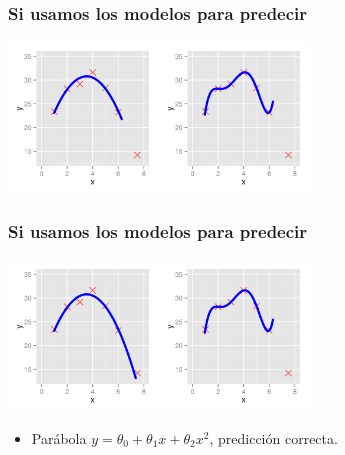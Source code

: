 \documentclass{beamer}
\begin{document}
 \begin{frame}\frametitle{Si usamos los modelos para predecir}
      \begin{overlayarea}{\textwidth}{8cm} 
 \begin{center}
   \includegraphics[height=4cm]{xyregularization-prediccion2050.png}
 \end{center}

   \end{overlayarea}

 \end{frame}
  \begin{frame}\frametitle{Si usamos los modelos para predecir}
      \begin{overlayarea}{\textwidth}{8cm} 
 \begin{center}
   \includegraphics[height=4cm]{xyregularization-prediccion2150.png}
 \end{center}
     \begin{itemize}
 \item Parábola $y=\theta_0+\theta_1x+\theta_2x^2$, predicción correcta.
 \end{itemize}

   \end{overlayarea}

 \end{frame}
\end{document}
